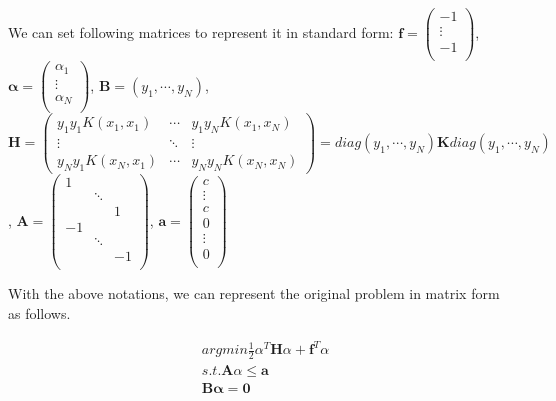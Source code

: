 \documentclass[10pt]{article}
\begin{document}
We can set following matrices to represent it in standard form:
$\mathbf{f}=\begin{pmatrix}
-1 \\
\vdots \\
-1 \\
\end{pmatrix}$, 
$\mathbf{\alpha}=\begin{pmatrix}
\alpha_1 \\
\vdots \\
\alpha_N \\
\end{pmatrix}$, 
$\mathbf{B}=(y_1,\cdots, y_N)$,
$\mathbf{H}=\begin{pmatrix}
y_{1}y_{1}K(x_1, x_1) & \cdots & y_{1}y_{N}K(x_{1}, x_{N}) \\
\vdots & \ddots & \vdots \\
y_{N}y_{1}K(x_N, x_1) & \cdots & y_{N}y_{N}K(x_{N}, x_{N}) 
\end{pmatrix}=diag(y_1, \cdots, y_N)\mathbf{K}diag(y_1, \cdots, y_N)$,
$\mathbf{A}=\begin{pmatrix}
1 & &  \\
& \ddots & \\
 & & 1 \\
 -1 & &  \\
  & \ddots & \\
 & & -1 \\
\end{pmatrix}$,
$\mathbf{a}=\begin{pmatrix}
c \\
\vdots \\
c \\
0 \\
\vdots \\
0 \\
\end{pmatrix}$

With the above notations, we can represent the original problem in matrix form as follows.

\begin{equation}
\begin{aligned}
& argmin \frac{1}{2}\alpha^{T}\mathbf{H}\alpha + \mathbf{f}^{T}\alpha \\
& s.t. \mathbf{A}\alpha \leq \mathbf{a} \\
& \mathbf{B\alpha}=\mathbf{0} \\
\end{aligned}
\end{equation}



\end{document}
